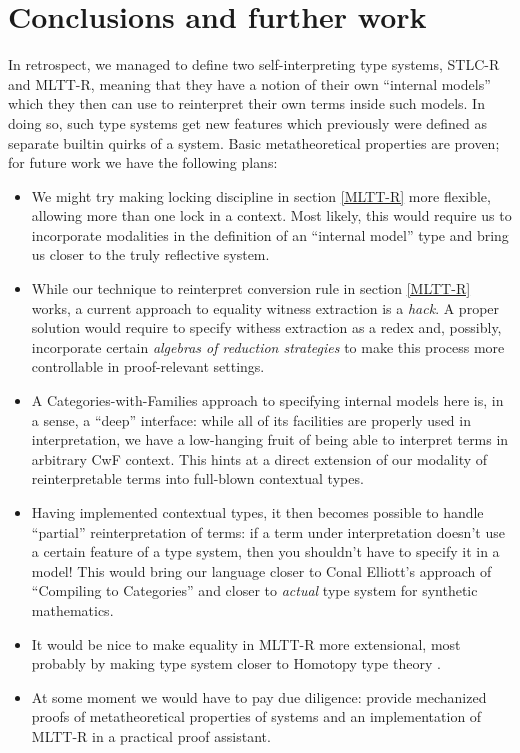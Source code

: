 \section{Conclusions and further work}

In retrospect, we managed to define two
self-interpreting type systems, STLC-R and MLTT-R,
meaning that they have a notion of their own ``internal
models'' which they then can use to reinterpret their
own terms inside such models. In doing so, such type
systems get new features which previously were defined
as separate builtin quirks of a system. Basic
metatheoretical properties are proven; for future work
we have the following plans:

\begin{itemize}
    \item We might try making locking discipline in
        section \ref{MLTT-R} more flexible, allowing
        more than one lock in a context. Most likely,
        this would require us to incorporate modalities
        in the definition of an ``internal model'' type
        and bring us closer to the truly reflective
        system.
    \item While our technique to reinterpret conversion
        rule in section \ref{MLTT-R} works, a current
        approach to equality witness extraction is a
        \textit{hack}. A proper solution would require
        to specify withess extraction as a redex and,
        possibly, incorporate certain \textit{algebras
        of reduction strategies} to make this process
        more controllable in proof-relevant settings.
    \item A Categories-with-Families approach to
        specifying internal models here is, in a sense,
        a ``deep'' interface: while all of its
        facilities are properly used in interpretation,
        we have a low-hanging fruit of being able to
        interpret terms in arbitrary CwF context. This
        hints at a direct extension of our modality of
        reinterpretable terms into full-blown contextual
        types.
    \item Having implemented contextual types, it then
        becomes possible to handle ``partial''
        reinterpretation of terms: if a term under
        interpretation doesn't use a certain feature of
        a type system, then you shouldn't have to
        specify it in a model! This would bring our
        language closer to Conal Elliott's approach of
        ``Compiling to Categories''
        \cite{Elliott:Compcat2017} and closer to
        \textit{actual} type system for synthetic
        mathematics.
    \item It would be nice to make equality in MLTT-R
        more extensional, most probably by making type
        system closer to Homotopy type theory
        \cite{hottbook}.
    \item At some moment we would have to pay due
        diligence: provide mechanized proofs of
        metatheoretical properties of systems and an
        implementation of MLTT-R in a practical proof
        assistant.
\end{itemize}
